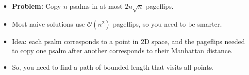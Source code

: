 \begin{frame}
    \frametitle{\problemtitle}
    \begin{itemize}
        \item<+-> \textbf{Problem:} Copy $n$ psalms in at most $2n\sqrt n$ pageflips.
        \item<+-> Most naive solutions use $\mathcal{O}(n^2)$ pageflips, so you need to be smarter.
        \item<+-> Idea: each psalm corresponds to a point in 2D space, and the pageflips needed to copy one psalm after another corresponds to their Manhattan distance.
        \item<+-> So, you need to find a path of bounded length that visits all points.
    \end{itemize}
    \vfill
    \centering
\end{frame}
